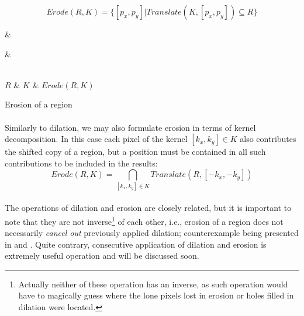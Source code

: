 \[
	Erode(R,K) = \{[p_x,p_y] | Translate(K, [p_x,p_y]) \subseteq R \}
\] 

\newarray\erosionInput
{}

\newarray\erosionKernel
{}

\newarray\erosionResult
{}

\begin{table}[h]
\centering
{}

 &
 &

\\

$R$ &
$K$ &
$Erode(R,K)$

\endtabular
\caption{Erosion of a region}
\label{tab:RegionErosion}
\end{table}

\paragraph*{}
Similarly to dilation, we may also formulate erosion in terms of kernel decomposition. In this case each pixel of the kernel $[k_x, k_y] \in K$ also contributes the shifted copy of a region, but a position must be contained in all such contributions to be included in the results:
\[
	Erode(R,K) = \bigcap_{[k_x, k_y] \in K} Translate(R, [-k_x, -k_y])
\]

\paragraph*{}
The operations of dilation and erosion are closely related, but it is important to note that they are not inverse\footnote{Actually neither of these operation has an inverse, as such operation would have to magically guess where the lone pixels lost in erosion or holes filled in dilation were located.} of each other, i.e., erosion of a region does not necessarily \textit{cancel out} previously applied dilation; counterexample being presented in  and . Quite contrary, consecutive application of dilation and erosion is extremely useful operation and will be discussed soon.

